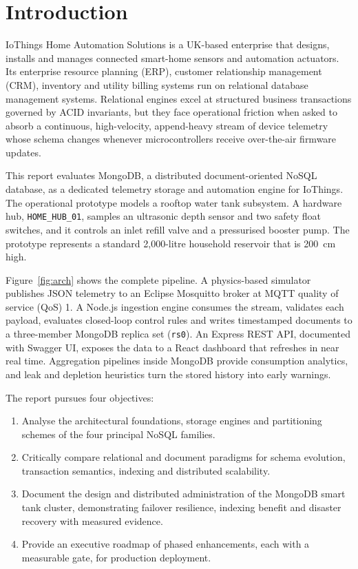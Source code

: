 \documentclass[11pt,a4paper]{article}
\begin{document}
\tableofcontents
\clearpage
\listoffigures
\listoftables
\clearpage
{}

\section{Introduction}

IoThings Home Automation Solutions is a UK-based enterprise that designs, installs and manages connected smart-home sensors and automation actuators. Its enterprise resource planning (ERP), customer relationship management (CRM), inventory and utility billing systems run on relational database management systems. Relational engines excel at structured business transactions governed by ACID invariants, but they face operational friction when asked to absorb a continuous, high-velocity, append-heavy stream of device telemetry whose schema changes whenever microcontrollers receive over-the-air firmware updates.

This report evaluates MongoDB, a distributed document-oriented NoSQL database, as a dedicated telemetry storage and automation engine for IoThings. The operational prototype models a rooftop water tank subsystem. A hardware hub, \texttt{HOME\_HUB\_01}, samples an ultrasonic depth sensor and two safety float switches, and it controls an inlet refill valve and a pressurised booster pump. The prototype represents a standard 2,000-litre household reservoir that is 200~cm high.

Figure~\ref{fig:arch} shows the complete pipeline. A physics-based simulator publishes JSON telemetry to an Eclipse Mosquitto broker at MQTT quality of service (QoS) 1. A Node.js ingestion engine consumes the stream, validates each payload, evaluates closed-loop control rules and writes timestamped documents to a three-member MongoDB replica set (\texttt{rs0}). An Express REST API, documented with Swagger UI, exposes the data to a React dashboard that refreshes in near real time. Aggregation pipelines inside MongoDB provide consumption analytics, and leak and depletion heuristics turn the stored history into early warnings.

The report pursues four objectives:
\begin{enumerate}[noitemsep]
\item Analyse the architectural foundations, storage engines and partitioning schemes of the four principal NoSQL families.
\item Critically compare relational and document paradigms for schema evolution, transaction semantics, indexing and distributed scalability.
\item Document the design and distributed administration of the MongoDB smart tank cluster, demonstrating failover resilience, indexing benefit and disaster recovery with measured evidence.
\item Provide an executive roadmap of phased enhancements, each with a measurable gate, for production deployment.
\end{enumerate}
\end{document}
